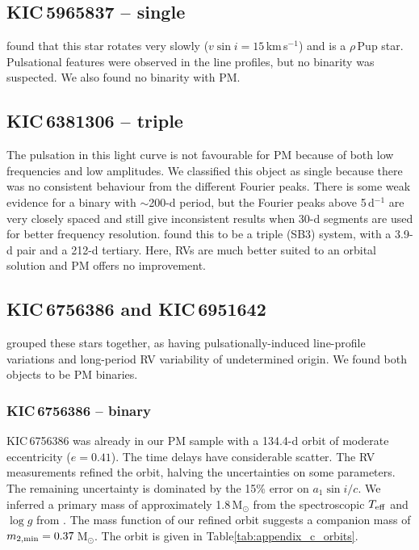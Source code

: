 \documentclass[a4paper,fleqn,usenatbib]{mnras}
\begin{document}
\subsection{KIC\,5965837 -- single}
\citeauthor{lampensetal2017} found that this star rotates very slowly ($v\sin i = 15$\,km\,s$^{-1}$) and is a $\rho$\,Pup star. Pulsational features were observed in the line profiles, but no binarity was suspected. We also found no binarity with PM.


\subsection{KIC\,6381306 -- triple}
The pulsation in this light curve is not favourable for PM because of both low frequencies and low amplitudes. We classified this object as single because there was no consistent behaviour from the different Fourier peaks. There is some weak evidence for a binary with $\sim$200-d period, but the Fourier peaks above 5\,d$^{-1}$ are very closely spaced and still give inconsistent results when 30-d segments are used for better frequency resolution. \citeauthor{lampensetal2017} found this to be a triple (SB3) system, with a 3.9-d pair and a 212-d tertiary. Here, RVs are much better suited to an orbital solution and PM offers no improvement.


\subsection{KIC\,6756386 and KIC\,6951642}
\citeauthor{lampensetal2017} grouped these stars together, as having pulsationally-induced line-profile variations and long-period RV variability of undetermined origin. We found both objects to be PM binaries.
\subsubsection{KIC\,6756386 -- binary}
KIC\,6756386 was already in our PM sample with a 134.4-d orbit of moderate eccentricity ($e=0.41$). The time delays have considerable scatter. The RV measurements refined the orbit, halving the uncertainties on some parameters. The remaining uncertainty is dominated by the 15\% error on $a_1 \sin i / c$. We inferred a primary mass of approximately 1.8\,M$_{\odot}$ from the spectroscopic $T_{\rm eff}$ and $\log g$ from \citeauthor{lampensetal2017}. The mass function of our refined orbit suggests a companion mass of $m_{\rm 2,min} = 0.37$\,M$_{\odot}$. The orbit is given in Table\:\ref{tab:appendix_c_orbits}.
\end{document}

